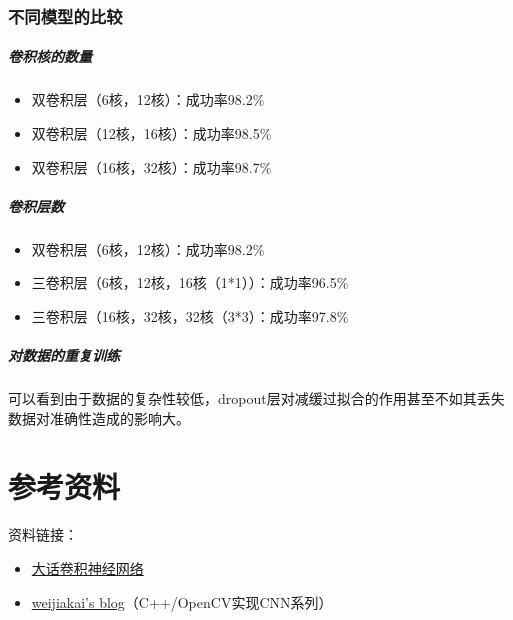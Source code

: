\documentclass[
aspectratio=169,  %
]{ctexbeamer}
\begin{document}
	\section{不同模型的比较}
		\begin{frame}
		\frametitle{卷积核的数量}	
		\begin{itemize}
			\item 双卷积层（6核，12核）：成功率98.2\%
			\item 双卷积层（12核，16核）：成功率98.5\%
			\item 双卷积层（16核，32核）：成功率98.7\%
		\end{itemize}
	\end{frame}
	
	\begin{frame}
		\frametitle{卷积层数}	
		\begin{itemize}
			\item 双卷积层（6核，12核）：成功率98.2\%
			\item 三卷积层（6核，12核，16核（1*1））：成功率96.5\%
			\item 三卷积层（16核，32核，32核（3*3）：成功率97.8\%
		\end{itemize}
	\end{frame}
	
	\begin{frame}
		\frametitle{对数据的重复训练}	
			
				\begin{figure}[H] %
					\centering %
					\label{Fig.main2} %
				\end{figure}
		可以看到由于数据的复杂性较低，dropout层对减缓过拟合的作用甚至不如其丢失数据对准确性造成的影响大。
	\end{frame}
	
	\part{参考资料}
	\begin{frame}
		资料链接：
		\begin{itemize}
		\item \href{https://zhuanlan.zhihu.com/p/122559611}{大话卷积神经网络}
		\item \href{https://www.cnblogs.com/weijiakai}{weijiakai's blog}（C++/OpenCV实现CNN系列）
		\end{itemize}
	\end{frame}
	\makebottom       %
	
	
\end{document}
